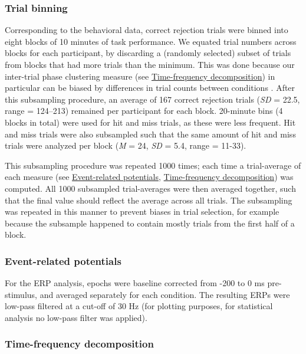\documentclass[11pt,english,]{memoir}
\begin{document}
\hypertarget{trial-binning}{%
\subsubsection{Trial binning}\label{trial-binning}}

Corresponding to the behavioral data, correct rejection trials were binned into eight blocks of 10 minutes of task performance. We equated trial numbers across blocks for each participant, by discarding a (randomly selected) subset of trials from blocks that had more trials than the minimum. This was done because our inter-trial phase clustering measure (see \protect\hyperlink{time-frequency-decomposition}{Time-frequency decomposition}) in particular can be biased by differences in trial counts between conditions \autocite{Cohen2014}. After this subsampling procedure, an average of 167 correct rejection trials (\emph{SD} = 22.5, range = 124--213) remained per participant for each block. 20-minute bins (4 blocks in total) were used for hit and miss trials, as these were less frequent. Hit and miss trials were also subsampled such that the same amount of hit and miss trials were analyzed per block (\emph{M} = 24, \emph{SD} = 5.4, range = 11-33).

This subsampling procedure was repeated 1000 times; each time a trial-average of each measure (see \protect\hyperlink{event-related-potentials}{Event-related potentials}, \protect\hyperlink{time-frequency-decomposition}{Time-frequency decomposition}) was computed. All 1000 subsampled trial-averages were then averaged together, such that the final value should reflect the average across all trials. The subsampling was repeated in this manner to prevent biases in trial selection, for example because the subsample happened to contain mostly trials from the first half of a block.

\hypertarget{event-related-potentials}{%
\subsubsection{Event-related potentials}\label{event-related-potentials}}

For the ERP analysis, epochs were baseline corrected from -200 to 0 ms pre-stimulus, and averaged separately for each condition. The resulting ERPs were low-pass filtered at a cut-off of 30 Hz (for plotting purposes, for statistical analysis no low-pass filter was applied).

\hypertarget{time-frequency-decomposition}{%
\subsubsection{Time-frequency decomposition}\label{time-frequency-decomposition}}
\end{document}
